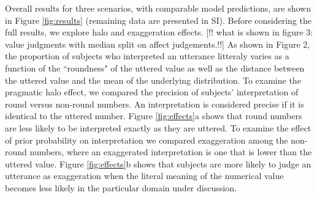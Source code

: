 \documentclass{article} %
\begin{document}
Overall results for three scenarios, with comparable model predictions, are shown in Figure \ref{fig:results} (remaining data are presented in SI). Before considering the full results, we explore halo and exaggeration effects.
[!! what is shown in figure 3: value judgments with median split on affect judgements.!!]
As shown in Figure 2, the proportion of subjects who interpreted an utterance litteraly varies as a function of the ``roundness" of the uttered value as well as the distance between the uttered value and the mean of the underlying distribution. 
To examine the pragmatic halo effect, we compared the precision of subjects' interpretation of round versus non-round numbers.
An interpretation is considered precise if it is identical to the uttered number. Figure \ref{fig:effects}a shows that round numbers are less likely to be interpreted exactly as they are uttered. 
To examine the effect of prior probability on interpretation we compared exaggeration among the non-round numbers, where an exaggerated interpretation is one that is lower than the uttered value. Figure \ref{fig:effects}b shows that subjects are more likely to judge an utterance as exaggeration when the literal meaning of the numerical value becomes less likely in the particular domain under discussion. 


\end{document}
